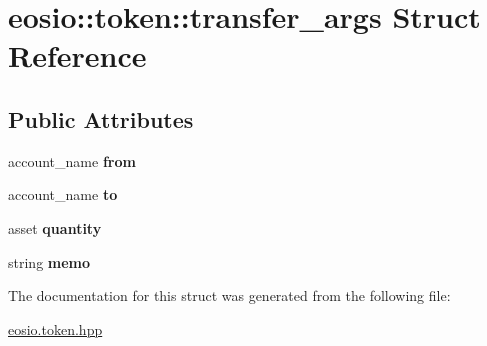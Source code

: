 \hypertarget{structeosio_1_1token_1_1transfer__args}{}\section{eosio\+:\+:token\+:\+:transfer\+\_\+args Struct Reference}
\label{structeosio_1_1token_1_1transfer__args}
\subsection*{Public Attributes}
\begin{DoxyCompactItemize}
\item 
\mbox{\label{structeosio_1_1token_1_1transfer__args_a7c88c1ade6cb2cdd431977e0c3b3668e}} 
account\+\_\+name {\bfseries from}
\item 
\mbox{\label{structeosio_1_1token_1_1transfer__args_a8d0efe51d87131b936f336b82f2683f4}} 
account\+\_\+name {\bfseries to}
\item 
\mbox{\label{structeosio_1_1token_1_1transfer__args_a8739988eae06a643dbbb62bd4ea4556a}} 
asset {\bfseries quantity}
\item 
\mbox{\label{structeosio_1_1token_1_1transfer__args_a93525854f40c4d7aaa9f18ab3404930e}} 
string {\bfseries memo}
\end{DoxyCompactItemize}


The documentation for this struct was generated from the following file\+:\begin{DoxyCompactItemize}
\item 
\mbox{\hyperlink{eosio_8token_8hpp}{eosio.\+token.\+hpp}}\end{DoxyCompactItemize}

